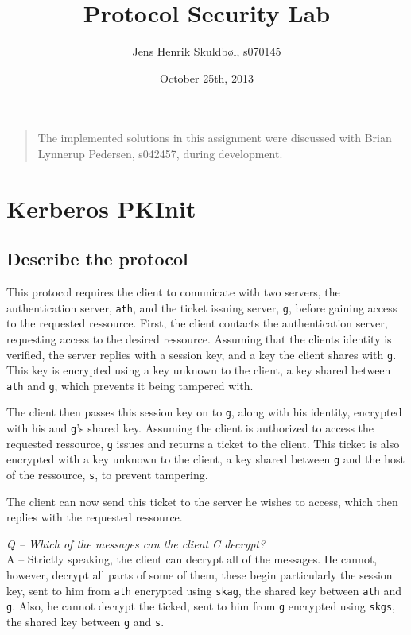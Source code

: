 \documentclass{article}
\title{Protocol Security Lab}
\author{Jens Henrik Skuldbøl, s070145}
\date{October 25th, 2013}
\newcommand\Q[1]{
	\leavevmode\par
	\noindent
	\emph{Q -- #1}
	\\
}
\newcommand\A[1]{
	A -- #1
}
\begin{document}
\maketitle
\thispagestyle{empty}

\begin{quote}
	The implemented solutions in this assignment were discussed
	with Brian Lynnerup Pedersen, s042457, during development.
\end{quote}

\newpage

\section{Kerberos PKInit}

\subsection{Describe the protocol}
This protocol requires the client to comunicate with two servers,
the authentication server, \texttt{ath}, and the ticket issuing server, 
\texttt{g}, before gaining access to the requested ressource.
First, the client contacts the authentication server, requesting access
to the desired ressource.
Assuming that the clients identity is verified, the server replies
with a session key, and a key the client shares with \texttt{g}.
This key is encrypted using a key unknown to the client,
a key shared between \texttt{ath} and \texttt{g},
which prevents it being tampered with.

The client then passes this session key on to \texttt{g},
along with his identity, encrypted with his and \texttt{g}'s shared key.
Assuming the client is authorized to access the requested ressource,
\texttt{g} issues and returns a ticket to the client.
This ticket is also encrypted with a key unknown to the client,
a key shared between \texttt{g} and the host of the ressource, \texttt{s},
to prevent tampering.

The client can now send this ticket to the server he wishes to access,
which then replies with the requested ressource.

\Q{Which of the messages can the client \emph{C} decrypt?}
\A{
	Strictly speaking, the client can decrypt all of the messages.
	He cannot, however, decrypt all parts of some of them, these begin
	particularly the session key, sent to him from \texttt{ath} encrypted
	using \texttt{skag}, the shared key between \texttt{ath} and \texttt{g}.
	Also, he cannot decrypt the ticked, sent to him from \texttt{g} encrypted
	using \texttt{skgs}, the shared key between \texttt{g} and \texttt{s}.
}
\end{document}
